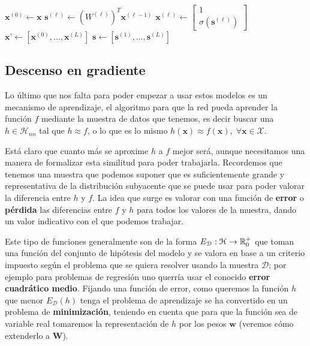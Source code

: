 \begin{algorithm}[htbp]
\SetAlgoLined
 $\textbf{x}^{(0)} \gets \textbf{x}$\;
  {
  $\textbf{s}^{(\ell)} \gets (W^{(\ell)})^T \textbf{x}^{(\ell - 1)}$\;
  $\textbf{x}^{(\ell)} \gets \begin{bmatrix} 1 \\ \sigma(\textbf{s}^{(\ell)})\end{bmatrix}$\;
 }
 $\textbf{x'} \gets \left[\textbf{x}^{(0)}, \ldots, \textbf{x}^{(L)}\right]$\;
 $\textbf{s} \gets \left[\textbf{s}^{(1)}, \ldots, \textbf{s}^{(L)}\right]$\;
 \caption{$ForwardPropagation(\textbf{x})$)}
 \label{alg:fp}
\end{algorithm}

\subsection{Descenso en gradiente}

Lo último que nos falta para poder empezar a usar estos modelos es un mecanismo de aprendizaje, el algoritmo para que la red pueda aprender la función $f$ mediante la muestra de datos que tenemos, es decir buscar una $h \in \mathcal{H}_{nn}$ tal que $h \approx f$, o lo que es lo mismo $h(\textbf{x}) \approx f(\textbf{x}), \; \forall \textbf{x} \in \mathcal{X}$.

Está claro que cuanto más se aproxime $h$ a $f$ mejor será, aunque necesitamos una manera de formalizar esta similitud para poder trabajarla. Recordemos que tenemos una muestra que podemos suponer que es suficientemente grande y representativa de la distribución subyacente que se puede usar para poder valorar la diferencia entre $h$ y $f$. La idea que surge es valorar con una función de \textbf{error} o \textbf{pérdida} las diferencias entre $f$ y $h$ para todos los valores de la muestra, dando un valor indicativo con el que podemos trabajar.

Este tipo de funciones generalmente son de la forma $E_{\mathcal{D}} : \mathcal{H} \to \mathbb{R}^+_0$ que toman una función del conjunto de hipótesis del modelo y se valora en base a un criterio impuesto según el problema que se quiera resolver usando la muestra $\mathcal{D}$; por ejemplo para problemas de regresión uno querría usar el conocido \textbf{error cuadrático medio}. Fijando una función de error, como queremos la función $h$ que menor $E_{\mathcal{D}}(h)$ tenga el problema de aprendizaje se ha convertido en un problema de \textbf{minimización}, teniendo en cuenta que para que la función sea de variable real tomaremos la representación de $h$ por los pesos $\textbf{w}$ (veremos cómo extenderlo a $\textbf{W}$).

